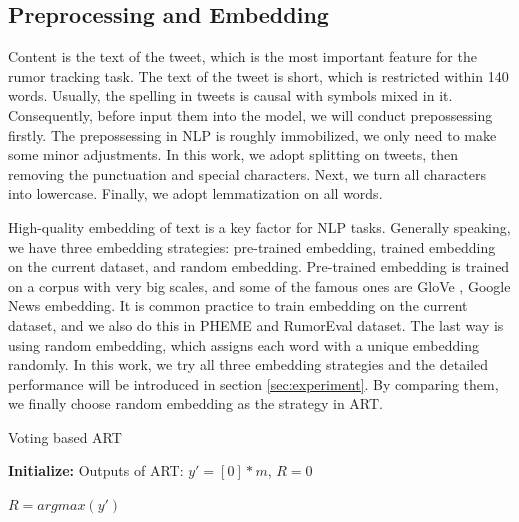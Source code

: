 \subsection{Preprocessing and Embedding}
\label{sec:process_embedding}
Content is the text of the tweet, which is the most important feature for the rumor tracking task. The text of the tweet is short, which is restricted within 140 words. Usually, the spelling in tweets is causal with symbols mixed in it. Consequently, before input them into the model, we will conduct prepossessing firstly. The prepossessing in NLP is roughly immobilized, we only need to make some minor adjustments. In this work, we adopt splitting on tweets, then removing the punctuation and special characters. Next, we turn all characters into lowercase. Finally, we adopt lemmatization on all words.

High-quality embedding of text is a key factor for NLP tasks. Generally speaking, we have three embedding strategies: pre-trained embedding, trained embedding on the current dataset, and random embedding. Pre-trained embedding is trained on a corpus with very big scales, and some of the famous ones are GloVe \cite{DBLP:conf/emnlp/PenningtonSM14}, Google News embedding\cite{googlenews}. It is common practice to train embedding on the current dataset, and we also do this in PHEME and RumorEval dataset. The last way is using random embedding, which assigns each word with a unique embedding randomly. In this work, we try all three embedding strategies and the detailed performance will be introduced in section \ref{sec:experiment}. By comparing them, we finally choose random embedding as the strategy in ART.

\begin{algorithm}[tbp]
	\caption{Voting based ART}
	\label{algorithm:art}
	\LinesNumbered %
	\textbf{Initialize:} Outputs of ART: $y' = [0]*m$, $R = 0$ \;
	
	
	$R = argmax(y')$
\end{algorithm}

